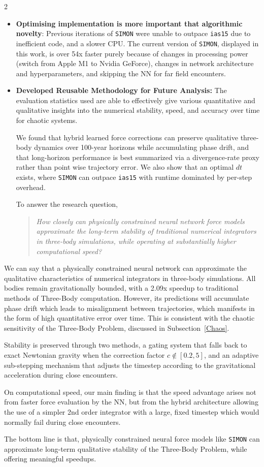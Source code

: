 \documentclass{article}
\begin{document}
\begin{multicols}{2}
\begin{itemize}
    \item \textbf{Optimising implementation is more important that algorithmic novelty}: Previous iterations of \texttt{SIMON} were unable to outpace \texttt{ias15} due to inefficient code, and a slower CPU. The current version of \texttt{SIMON}, displayed in this work, is over 54x faster purely because of changes in processing power (switch from Apple M1 to Nvidia GeForce), changes in network architecture and hyperparameters, and skipping the NN for far field encounters.
    \item \textbf{Developed Reusable Methodology for Future Analysis:} The evaluation statistics used are able to effectively give various quantitative and qualitative insights into the numerical stability, speed, and accuracy over time for chaotic systems.

We found that hybrid learned force corrections can preserve qualitative three-body dynamics over 100-year horizons while accumulating phase drift, and that long-horizon performance is best summarized via a divergence-rate proxy rather than point wise trajectory error. We also show that an optimal $dt$ exists, where \texttt{SIMON} can outpace \texttt{ias15} with runtime dominated by per-step overhead.

To answer the research question, 

\begin{quote}
\emph{How closely can physically constrained neural network force models approximate the long-term stability of traditional numerical integrators in three-body simulations, while operating at substantially higher computational speed?}
\end{quote}
\end{itemize}

We can say that a physically constrained neural network can approximate the qualitative characteristics of numerical integrators in three-body simulations. All bodies remain gravitationally bounded, with a 2.09x speedup to traditional methods of Three-Body computation. However, its predictions will accumulate phase drift which leads to misalignment between trajectories, which manifests in the form of high quantitative error over time. This is consistent with the chaotic sensitivity of the Three-Body Problem, discussed in Subsection~\ref{Chaos}.

Stability is preserved through two methods, a gating system that falls back to exact Newtonian gravity when the correction factor $c \notin [0.2, 5]$, and an adaptive sub-stepping mechanism that adjusts the timestep according to the gravitational acceleration during close encounters.

On computational speed, our main finding is that the speed advantage arises not from faster force evaluation by the NN, but from the hybrid architecture allowing the use of a simpler 2nd order integrator with a large, fixed timestep which would normally fail during close encounters.

The bottom line is that, physically constrained neural force models like \texttt{SIMON} can approximate long-term qualitative stability of the Three-Body Problem, while offering meaningful speedups.
 
{}
\end{multicols}
\end{document}
